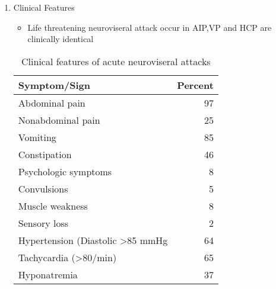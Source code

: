\documentclass{scrartcl}
\begin{document}
\begin{enumerate}
\item Clinical Features
\label{sec:orgcedb5d6}
\begin{itemize}
\item Life threatening neuroviseral attack occur in AIP,VP and HCP
are clinically identical
\end{itemize}
\begin{table}[htbp]
\caption{\label{tab:org573892e}
Clinical features of acute neuroviseral attacks}
\centering
\begin{tabular}{lr}
Symptom/Sign & Percent\\
\hline
Abdominal pain & 97\\
Nonabdominal pain & 25\\
Vomiting & 85\\
Constipation & 46\\
Psychologic symptoms & 8\\
Convulsions & 5\\
Muscle weakness & 8\\
Sensory loss & 2\\
Hypertension (Diastolic >85 mmHg & 64\\
Tachycardia (>80/min) & 65\\
Hyponatremia & 37\\
\end{tabular}
\end{table}


\end{enumerate}
\end{document}
